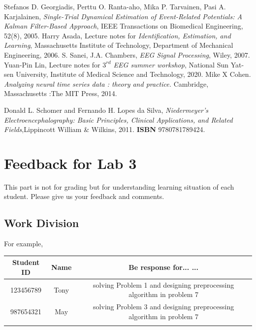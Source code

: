 \documentclass[a4 paper]{article}
\begin{document}
\begin{thebibliography}{6}
Stefanos D. Georgiadis, Perttu O. Ranta-aho, Mika P. Tarvainen, Pasi A. Karjalainen, 
\textit{Single-Trial Dynamical Estimation of Event-Related Potentials: A Kalman Filter-Based Approach}, IEEE Transactions on Biomedical Engineering, 52(8), 2005.
Harry Asada, Lecture notes for \textit{Identification, Estimation, and Learning}, Massachusetts Institute of Technology, 
 Department of Mechanical Engineering, 2006.
S. Sanei, J.A. Chambers, \textit{EEG Signal Processing}, Wiley, 2007. 
Yuan-Pin Lin, Lecture notes for \textit{$3^{rd}$ EEG summer workshop}, National Sun Yat-sen University, Institute of Medical Science and Technology, 2020.
Mike X Cohen. \textit{Analyzing neural time series data : theory and practice.} Cambridge, Massachusetts :The MIT Press, 2014.


Donald L. Schomer and Fernando H. Lopes da Silva,
\textit{Niedermeyer's Electroencephalography: Basic Principles, Clinical Applications, and Related Fields},Lippincott William \& Wilkins, 2011. \textbf{ISBN} 9780781789424.

\end{thebibliography}
\newpage
\section{Feedback for Lab 3}
This part is not for grading but for understanding learning situation of each student. Please give us your feedback and comments.
\subsection{Work Division}
For example,\\
\begin{center}
    \begin{tabular}{||c|c|c||}
    \hline
     Student ID & Name & Be response for... ... \\
    \hline
     123456789 & Tony & solving Problem 1 and designing preprocessing algorithm in problem 7\\
     \hline
     987654321 & May & solving Problem 3 and designing preprocessing algorithm in problem 7\\
     \hline
      & & \\
     \hline
\end{tabular}
\end{center}
\end{document}
